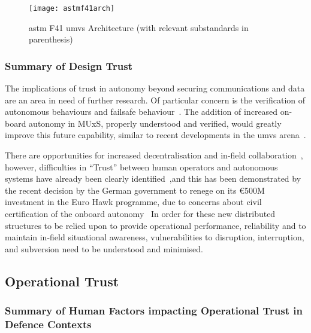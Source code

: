 \begin{figure}
  \texttt{[image: astmf41arch]}
  \caption[\acrshort{astm} F41 \acrshort{umvs} Architecture]{\acrshort{astm} F41 \acrshort{umvs} Architecture  (with relevant substandards in parenthesis)}
  \label{fig:astmf41arch}
\end{figure}

\subsubsection{Summary of Design Trust}

The implications of trust in autonomy beyond securing communications and data are an area in need of further research.
Of particular concern is the verification of autonomous behaviours and failsafe behaviour~\cite{BAESystems2013}.
The addition of increased on-board autonomy in MUxS, properly understood and verified, would greatly improve this future capability, similar to recent developments in the \gls{umvs} arena~\cite{Cummings2010}.

There are opportunities for increased decentralisation and in-field collaboration~\cite{Walton2012}, however, difficulties in ``Trust'' between human operators and autonomous systems have already been clearly identified~\cite{Chen2011b},and this has been demonstrated by the recent decision by the German government to renege on its \euro500M investment in the Euro Hawk programme, due to concerns about civil certification of the onboard autonomy~\cite{Mehta2013}
In order for these new distributed structures to be relied upon to provide operational performance, reliability and to maintain in-field situational awareness, vulnerabilities to disruption, interruption, and subversion need to be understood and minimised.

\subsection{Operational Trust}

\subsubsection{Summary of Human Factors impacting Operational Trust in Defence Contexts}

